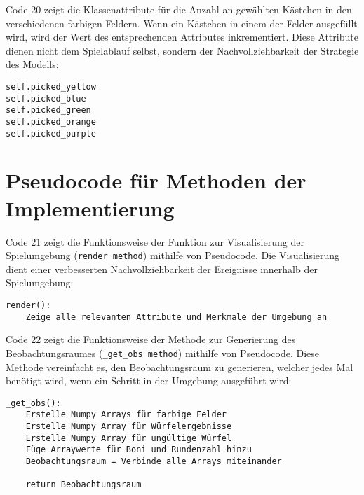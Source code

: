 \begin{minipage}{\linewidth}
Code 20 zeigt die Klassenattribute für die Anzahl an gewählten Kästchen in den verschiedenen farbigen Feldern. Wenn ein Kästchen in einem der Felder ausgefüllt wird, wird der Wert des entsprechenden Attributes inkrementiert. Diese Attribute dienen nicht dem Spielablauf selbst, sondern der Nachvollziehbarkeit der Strategie des Modells:
\vspace{0.5cm}
\begin{lstlisting}[caption={Klassenattribute für die Anzahl an gewählte Kästchen innerhalb der farbigen Feldern}, basicstyle=\ttfamily]
self.picked_yellow
self.picked_blue
self.picked_green
self.picked_orange
self.picked_purple
\end{lstlisting}
\end{minipage}

\newpage
\section{Pseudocode für Methoden der Implementierung}
\begin{minipage}{\linewidth}
Code 21 zeigt die Funktionsweise der Funktion zur Visualisierung der Spielumgebung (\texttt{render method}) mithilfe von Pseudocode. Die Visualisierung dient einer verbesserten Nachvollziehbarkeit der Ereignisse innerhalb der Spielumgebung:
\vspace{0.5cm}
\begin{lstlisting}[caption={Methode zur Visualisierung der Spielumgebung}]
render():
	Zeige alle relevanten Attribute und Merkmale der Umgebung an
\end{lstlisting}
\end{minipage}

\begin{minipage}{\linewidth}
Code 22 zeigt die Funktionsweise der Methode zur Generierung des Beobachtungsraumes (\texttt{\_get\_obs method}) mithilfe von Pseudocode. Diese Methode vereinfacht es, den Beobachtungsraum zu generieren, welcher jedes Mal benötigt wird, wenn ein Schritt in der Umgebung ausgeführt wird:
\vspace{0.5cm}
\begin{lstlisting}[caption={Methode zur Generierung des Beobachtungsraumes}]
_get_obs():
	Erstelle Numpy Arrays für farbige Felder
	Erstelle Numpy Array für Würfelergebnisse
	Erstelle Numpy Array für ungültige Würfel
	Füge Arraywerte für Boni und Rundenzahl hinzu
	Beobachtungsraum = Verbinde alle Arrays miteinander

	return Beobachtungsraum
\end{lstlisting}
\end{minipage}

